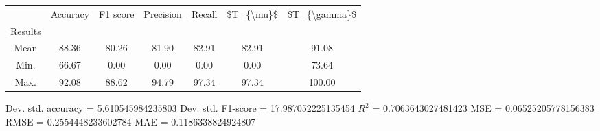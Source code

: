 \begin{tabular}{|c|c|c|c|c|c|c|}
\toprule
{} &  Accuracy &  F1 score &  Precision &  Recall &  \$T\_\{\textbackslash mu\}\$ &  \$T\_\{\textbackslash gamma\}\$ \\
Results &           &           &            &         &            &               \\
\hline
Mean    &     88.36 &     80.26 &      81.90 &   82.91 &      82.91 &         91.08 \\
Min.    &     66.67 &      0.00 &       0.00 &    0.00 &       0.00 &         73.64 \\
Max.    &     92.08 &     88.62 &      94.79 &   97.34 &      97.34 &        100.00 \\
\bottomrule
\end{tabular}

 Dev. std. accuracy = 5.610545984235803
 Dev. std. F1-score = 17.987052225135454
 $R^2$ = 0.7063643027481423
 MSE = 0.06525205778156383
 RMSE = 0.2554448233602784
 MAE = 0.1186338824924807